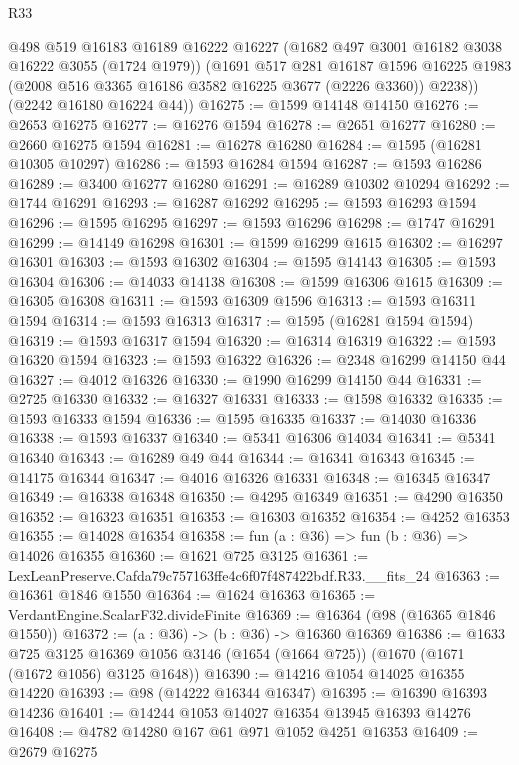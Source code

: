 \begin{lexlean}{R33}
\begin{coremodule}
        @498
        @519
        @16183
        @16189
        @16222
        @16227
        (@1682 @497 @3001 @16182 @3038 @16222 @3055 (@1724 @1979))
        (@1691
          @517
          @281
          @16187
          @1596
          @16225
          @1983
          (@2008 @516 @3365 @16186 @3582 @16225 @3677 (@2226 @3360))
          @2238))
      (@2242 @16180 @16224 @44))
@16275 := @1599 @14148 @14150
@16276 := @2653 @16275
@16277 := @16276 @1594
@16278 := @2651 @16277
@16280 := @2660 @16275 @1594
@16281 := @16278 @16280
@16284 := @1595 (@16281 @10305 @10297)
@16286 := @1593 @16284 @1594
@16287 := @1593 @16286
@16289 := @3400 @16277 @16280
@16291 := @16289 @10302 @10294
@16292 := @1744 @16291
@16293 := @16287 @16292
@16295 := @1593 @16293 @1594
@16296 := @1595 @16295
@16297 := @1593 @16296
@16298 := @1747 @16291
@16299 := @14149 @16298
@16301 := @1599 @16299 @1615
@16302 := @16297 @16301
@16303 := @1593 @16302
@16304 := @1595 @14143
@16305 := @1593 @16304
@16306 := @14033 @14138
@16308 := @1599 @16306 @1615
@16309 := @16305 @16308
@16311 := @1593 @16309 @1596
@16313 := @1593 @16311 @1594
@16314 := @1593 @16313
@16317 := @1595 (@16281 @1594 @1594)
@16319 := @1593 @16317 @1594
@16320 := @16314 @16319
@16322 := @1593 @16320 @1594
@16323 := @1593 @16322
@16326 := @2348 @16299 @14150 @44
@16327 := @4012 @16326
@16330 := @1990 @16299 @14150 @44
@16331 := @2725 @16330
@16332 := @16327 @16331
@16333 := @1598 @16332
@16335 := @1593 @16333 @1594
@16336 := @1595 @16335
@16337 := @14030 @16336
@16338 := @1593 @16337
@16340 := @5341 @16306 @14034
@16341 := @5341 @16340
@16343 := @16289 @49 @44
@16344 := @16341 @16343
@16345 := @14175 @16344
@16347 := @4016 @16326 @16331
@16348 := @16345 @16347
@16349 := @16338 @16348
@16350 := @4295 @16349
@16351 := @4290 @16350
@16352 := @16323 @16351
@16353 := @16303 @16352
@16354 := @4252 @16353
@16355 := @14028 @16354
@16358 := fun (a : @36) => fun (b : @36) => @14026 @16355
@16360 := @1621 @725 @3125
@16361 := LexLeanPreserve.Cafda79c757163ffe4c6f07f487422bdf.R33.__fits_24
@16363 := @16361 @1846 @1550
@16364 := @1624 @16363
@16365 := VerdantEngine.ScalarF32.divideFinite
@16369 := @16364 (@98 (@16365 @1846 @1550))
@16372 := (a : @36) -> (b : @36) -> @16360 @16369
@16386 := @1633
    @725
    @3125
    @16369
    @1056
    @3146
    (@1654 (@1664 @725))
    (@1670 (@1671 (@1672 @1056) @3125 @1648))
@16390 := @14216 @1054 @14025 @16355 @14220
@16393 := @98 (@14222 @16344 @16347)
@16395 := @16390 @16393 @14236
@16401 := @14244 @1053 @14027 @16354 @13945 @16393 @14276
@16408 := @4782 @14280 @167 @61 @971 @1052 @4251 @16353
@16409 := @2679 @16275

\end{coremodule}
\end{lexlean}
